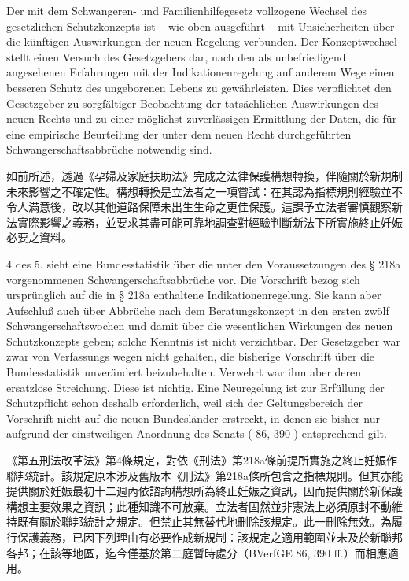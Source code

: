 \documentclass[12pt]{article}
\begin{document}
\begin{sourcepara}[title={原文E.193}]
Der mit dem Schwangeren- und Familienhilfegesetz vollzogene Wechsel des gesetzlichen Schutzkonzepts ist -- wie oben ausgeführt -- mit Unsicherheiten über die künftigen Auswirkungen der neuen Regelung verbunden. Der Konzeptwechsel stellt einen Versuch des Gesetzgebers dar, nach den als unbefriedigend angesehenen Erfahrungen mit der Indikationenregelung auf anderem Wege einen besseren Schutz des ungeborenen Lebens zu gewährleisten. Dies verpflichtet den Gesetzgeber zu sorgfältiger Beobachtung der tatsächlichen Auswirkungen des neuen Rechts und zu einer möglichst zuverlässigen Ermittlung der Daten, die für eine empirische Beurteilung der unter dem neuen Recht durchgeführten Schwangerschaftsabbrüche notwendig sind.
\end{sourcepara}
\begin{transpara}
如前所述，透過《孕婦及家庭扶助法》完成之法律保護構想轉換，伴隨關於新規制未來影響之不確定性。構想轉換是立法者之一項嘗試：在其認為指標規則經驗並不令人滿意後，改以其他道路保障未出生生命之更佳保護。這課予立法者審慎觀察新法實際影響之義務，並要求其盡可能可靠地調查對經驗判斷新法下所實施終止妊娠必要之資料。
\end{transpara}

\begin{sourcepara}[title={原文E.194}]
\abbrArt{} 4 des 5. \abbrStrRG{} sieht eine Bundesstatistik über die unter den Voraussetzungen des § 218a \abbrStGB{} vorgenommenen Schwangerschaftsabbrüche vor. Die Vorschrift bezog sich ursprünglich auf die in § 218a \abbrStGB{} \abbrAF{} enthaltene Indikationenregelung. Sie kann aber Aufschluß auch über Abbrüche nach dem Beratungskonzept in den ersten zwölf Schwangerschaftswochen und damit über die wesentlichen Wirkungen des neuen Schutzkonzepts geben; solche Kenntnis ist nicht verzichtbar. Der Gesetzgeber war zwar von Verfassungs wegen nicht gehalten, die bisherige Vorschrift über die Bundesstatistik unverändert beizubehalten. Verwehrt war ihm aber deren ersatzlose Streichung. Diese ist nichtig. Eine Neuregelung ist zur Erfüllung der Schutzpflicht schon deshalb erforderlich, weil sich der Geltungsbereich der Vorschrift nicht auf die neuen Bundesländer erstreckt, in denen sie bisher nur aufgrund der einstweiligen Anordnung des Senats (\abbrBVerfGE{} 86, 390 \abbrFF{}) entsprechend gilt.
\end{sourcepara}
\begin{transpara}
《第五刑法改革法》第4條規定，對依《刑法》第218a條前提所實施之終止妊娠作聯邦統計。該規定原本涉及舊版本《刑法》第218a條所包含之指標規則。但其亦能提供關於妊娠最初十二週內依諮詢構想所為終止妊娠之資訊，因而提供關於新保護構想主要效果之資訊；此種知識不可放棄。立法者固然並非憲法上必須原封不動維持既有關於聯邦統計之規定。但禁止其無替代地刪除該規定。此一刪除無效。為履行保護義務，已因下列理由有必要作成新規制：該規定之適用範圍並未及於新聯邦各邦；在該等地區，迄今僅基於第二庭暫時處分（BVerfGE 86, 390 ff.）而相應適用。
\end{transpara}
\end{document}
